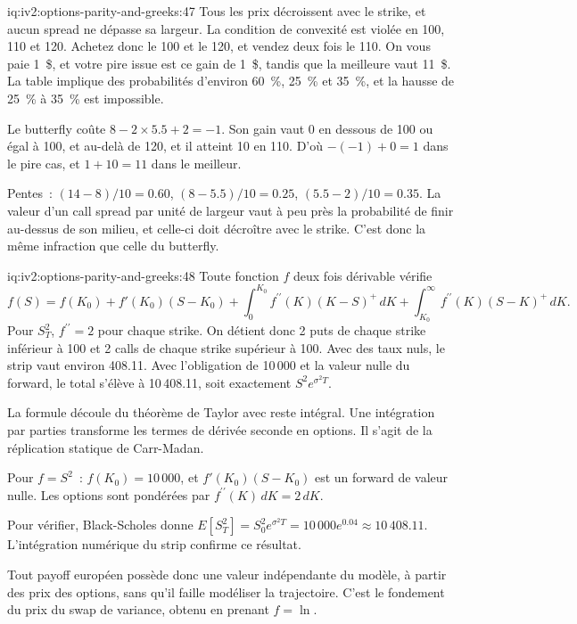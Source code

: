 \begin{solution}{iq:iv2:options-parity-and-greeks:47}
Tous les prix décroissent avec le strike, et aucun spread ne dépasse sa largeur. La condition de convexité est violée en 100, 110 et 120. Achetez donc le 100 et le 120, et vendez deux fois le 110. On vous paie 1~\$, et votre pire issue est ce gain de 1~\$, tandis que la meilleure vaut 11~\$. La table implique des probabilités d'environ 60~\%, 25~\% et 35~\%, et la hausse de 25~\% à 35~\% est impossible.

Le butterfly coûte $8 - 2 \times 5.5 + 2 = -1$. Son gain vaut 0 en dessous de 100 ou égal à 100, et au-delà de 120, et il atteint 10 en 110. D'où $-(-1) + 0 = 1$ dans le pire cas, et $1 + 10 = 11$ dans le meilleur.

Pentes~: $(14 - 8)/10 = 0.60$, $(8 - 5.5)/10 = 0.25$, $(5.5 - 2)/10 = 0.35$. La valeur d'un call spread par unité de largeur vaut à peu près la probabilité de finir au-dessus de son milieu, et celle-ci doit décroître avec le strike. C'est donc la même infraction que celle du butterfly.

\end{solution}

\begin{solution}{iq:iv2:options-parity-and-greeks:48}
Toute fonction $f$ deux fois dérivable vérifie
\[
f(S) = f(K_0) + f'(K_0)(S - K_0) + \int_0^{K_0}f^{\prime\prime}(K)(K - S)^+\,dK + \int_{K_0}^\infty f^{\prime\prime}(K)(S - K)^+\,dK.
\]
Pour $S_T^2$, $f^{\prime\prime} = 2$ pour chaque strike. On détient donc 2 puts de chaque strike inférieur à 100 et 2 calls de chaque strike supérieur à 100. Avec des taux nuls, le strip vaut environ 408.11. Avec l'obligation de 10\,000 et la valeur nulle du forward, le total s'élève à 10\,408.11, soit exactement $S^2e^{\sigma^2T}$.

La formule découle du théorème de Taylor avec reste intégral. Une intégration par parties transforme les termes de dérivée seconde en options. Il s'agit de la réplication statique de Carr-Madan.

Pour $f = S^2$~: $f(K_0) = 10\,000$, et $f'(K_0)(S - K_0)$ est un forward de valeur nulle. Les options sont pondérées par $f^{\prime\prime}(K)\,dK = 2\,dK$.

Pour vérifier, Black-Scholes donne $E[S_T^2] = S_0^2e^{\sigma^2T} = 10\,000e^{0.04} \approx 10\,408.11$. L'intégration numérique du strip confirme ce résultat.

Tout payoff européen possède donc une valeur indépendante du modèle, à partir des prix des options, sans qu'il faille modéliser la trajectoire. C'est le fondement du prix du swap de variance, obtenu en prenant $f = \ln$.

\end{solution}

